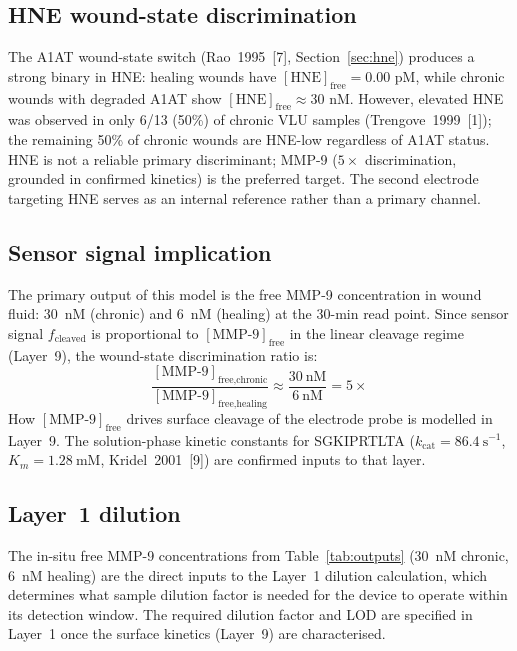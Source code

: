 \documentclass[10pt,a4paper]{article}
\numberwithin{equation}{section}
\newcommand{\cit}[1]{[#1]}   %
\begin{document}
\subsection{HNE wound-state discrimination}

The A1AT wound-state switch (Rao~1995~\cit{7}, Section~\ref{sec:hne}) produces a
strong binary in HNE: healing wounds have $[\text{HNE}]_{\text{free}} = 0.00$ pM,
while chronic wounds with degraded A1AT show $[\text{HNE}]_{\text{free}} \approx 30$ nM.
However, elevated HNE was observed in only 6/13 (50\%) of chronic VLU samples
(Trengove~1999~\cit{1}); the remaining 50\% of chronic wounds are HNE-low regardless
of A1AT status. HNE is not a reliable primary discriminant; MMP-9 ($5\times$
discrimination, grounded in confirmed kinetics) is the preferred target. The second
electrode targeting HNE serves as an internal reference rather than a primary channel.

\subsection{Sensor signal implication}

The primary output of this model is the free MMP-9 concentration in wound fluid:
30~nM (chronic) and 6~nM (healing) at the 30-min read point. Since sensor signal
$f_{\text{cleaved}}$ is proportional to $[\text{MMP-9}]_{\text{free}}$ in the linear
cleavage regime (Layer~9), the wound-state discrimination ratio is:
\begin{equation}
  \frac{[\text{MMP-9}]_{\text{free,chronic}}}{[\text{MMP-9}]_{\text{free,healing}}}
  \approx \frac{30\ \text{nM}}{6\ \text{nM}} = 5\times
  \label{eq:activity_ratio}
\end{equation}
How $[\text{MMP-9}]_{\text{free}}$ drives surface cleavage of the electrode probe is
modelled in Layer~9. The solution-phase kinetic constants for SGKIPRTLTA
($k_{\text{cat}} = 86.4\ \text{s}^{-1}$, $K_m = 1.28\ \text{mM}$, Kridel~2001~\cit{9})
are confirmed inputs to that layer.

\subsection{Layer~1 dilution}

The in-situ free MMP-9 concentrations from Table~\ref{tab:outputs} (30~nM chronic,
6~nM healing) are the direct inputs to the Layer~1 dilution calculation, which
determines what sample dilution factor is needed for the device to operate within its
detection window. The required dilution factor and LOD are specified in Layer~1 once
the surface kinetics (Layer~9) are characterised.
\end{document}
